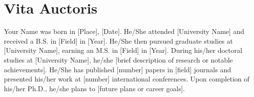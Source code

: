 \documentclass[phdthesis,12pt,final]{wuthesis}
\theoremstyle{definition}
\theoremstyle{definition}
\theoremstyle{definition}
\theoremstyle{definition}
\theoremstyle{remark}
\begin{document}
\backmatter

\cleardoublepage
{}
{}
\chapter*{Vita Auctoris}
\begin{doublespace}
Your Name was born in {[}Place{]}, {[}Date{]}. He/She attended {[}University Name{]} and received a B.S. in {[}Field{]} in {[}Year{]}. He/She then pursued graduate studies at {[}University Name{]}, earning an M.S. in {[}Field{]} in {[}Year{]}. During his/her doctoral studies at {[}University Name{]}, he/she {[}brief description of research or notable achievements{]}. He/She has published {[}number{]} papers in {[}field{]} journals and presented his/her work at {[}number{]} international conferences. Upon completion of his/her Ph.D., he/she plans to {[}future plans or career goals{]}.
\end{doublespace}
\end{document}
